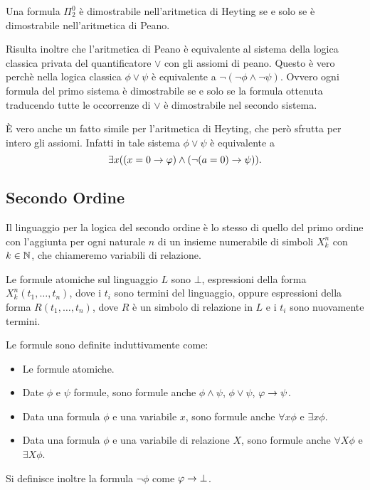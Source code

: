 \documentclass[]{marticle}
\begin{document}
\begin{block}[Teorema]
    Una formula $\Pi^0_2$ \`e dimostrabile nell'aritmetica di Heyting se e solo
    se \`e dimostrabile nell'aritmetica di Peano.
\end{block}

Risulta inoltre che l'aritmetica di Peano \`e equivalente al sistema della
logica classica privata del quantificatore $\lor$ con gli assiomi di peano.
Questo \`e vero perch\`e nella logica classica $\phi\lor\psi$ \`e equivalente a
$\lnot (\lnot\phi \land \lnot \psi)$. Ovvero ogni formula del primo sistema \`e
dimostrabile se e solo se la formula ottenuta traducendo tutte le occorrenze di
$\lor$ \`e dimostrabile nel secondo sistema.

\`E vero anche un fatto simile per l'aritmetica di Heyting, che per\`o sfrutta
per intero gli assiomi. Infatti in tale sistema $\phi\lor\psi$ \`e equivalente a
\[
    \exists x ((x=0 \rightarrow \varphi) \land (\lnot (a=0)\rightarrow\psi)).
\]

\subsection{Secondo Ordine}
\begin{block}[Definizione]
    Il linguaggio per la logica del secondo ordine \`e lo stesso di quello del
    primo ordine con l'aggiunta per ogni naturale $n$ di un insieme numerabile
    di simboli $X_k^n$ con $k\in\mathbb{N}$, che chiameremo variabili di relazione.  
    
    Le formule atomiche sul linguaggio $L$ sono $\bot$, espressioni della forma
    $X^n_k(t_1, \dots, t_n)$, dove i $t_i$ sono termini del linguaggio, oppure
    espressioni della forma $R(t_1, \dots, t_n)$, dove $R$ \`e un simbolo di
    relazione in $L$ e i $t_i$ sono nuovamente termini.

    Le formule sono definite induttivamente come:
    \begin{itemize}
        \item Le formule atomiche.
        \item Date $\phi$ e $\psi$ formule, sono formule anche $\phi \land
            \psi$, $\phi \lor \psi$, $\varphi \rightarrow \psi$.
        \item Data una formula $\phi$ e una variabile $x$, sono formule anche
            $\forall x \phi$ e $\exists x \phi$.
        \item Data una formula $\phi$ e una variabile di relazione $X$, sono
            formule anche $\forall X \phi$ e $\exists X \phi$.
    \end{itemize}
    Si definisce inoltre la formula $\lnot \phi$ come $\varphi \rightarrow \bot$.
\end{block} 
\end{document}
